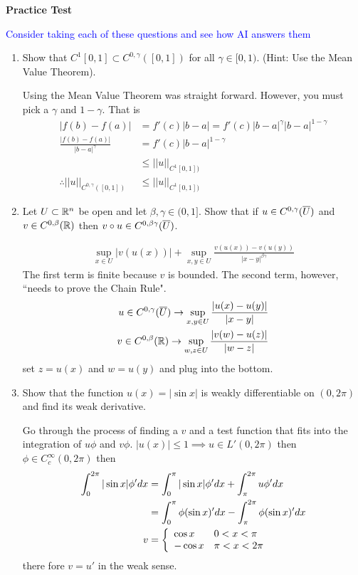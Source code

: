 \documentclass[12pt,a4paper]{report}
\newcommand{\BLUE}[1]{\textcolor{blue}{#1}}
\newcommand{\HSPACE}[3]{C^{#1,#2}(#3)}
\newcommand{\HOLDERNORM}[4]{|| #4 ||_{\HSPACE{#1}{#2}{#3}}}
\begin{document}
\newpage
\textbf{Practice Test}

\BLUE{Consider taking each of these questions and see how AI answers them}

\begin{enumerate}
	\item Show that $C^1[0,1]\subset \HSPACE{0}{\gamma}{[0,1]}$ for all $\gamma \in [0,1)$.  (Hint: Use the Mean Value Theorem).

	Using the Mean Value Theorem was straight forward.  However, you must pick a $\gamma$ and $1-\gamma$.  That is
	\begin{align*}
		|f(b) - f(a)| &= f'(c)|b-a| = f'(c)|b-a|^\gamma|b-a|^{1-\gamma}\\
		\frac{|f(b) - f(a)|}{|b-a|^\gamma} &= f'(c)|b-a|^{1-\gamma}\\
		&\le ||u||_{C^1{[0,1])}} \\
		\therefore \HOLDERNORM{0}{\gamma}{[0,1]}{u} &\le ||u||_{C^1{[0,1])}} 
\end{align*}		
	\newpage
	\item Let $U \subset \mathbb{R}^n$ be open and let $\beta, \gamma \in (0,1]$.  Show that if $u \in \HSPACE{0}{\gamma}{\CONJ{U}}$ and $v \in \HSPACE{0}{\beta}{\R}$ then $v\circ u \in \HSPACE{0}{\beta\gamma}{\CONJ{U}}$.
	
	\begin{align*}
		\sup_{x\in U} |v(u(x))| + \sup_{x,y \in U} \frac{v(u(x))-v(u(y))}{|x-y|^{\beta\gamma}}
	\end{align*}The first term is finite because $v$ is bounded.  The second term, however, ``needs to prove the Chain Rule".
	\begin{align*}
		u \in \HSPACE{0}{\gamma}{\CONJ{U}} \to \sup_{x,y\in U} \frac{|u(x)-u(y)|}{|x-y|} \\
		v \in \HSPACE{0}{\beta}{\R} \to \sup_{w,z\in U} \frac{|v(w)-u(z)|}{|w-z|}
	\end{align*}set $z=u(x)$ and $w=u(y)$ and plug into the bottom.
	
	\newpage
	\item Show that the function $u(x) = |\sin x|$ is weakly differentiable on $(0,2\pi)$ and find its weak derivative.
	
	Go through the process of finding a $v$ and a test function that fits into the integration of $u\phi$ and $v\phi$.  $|u(x)|\le 1 \implies u\in L'(0,2\pi)$ then $\phi \in C_c^\infty(0,2\pi)$ then
	\begin{align*}
		\int_0^{2\pi} |\sin x|\phi' dx &= \int_0^{\pi} |\sin x|\phi' dx + \int_\pi^{2\pi} u\phi' dx \\
		&= \int_0^{\pi} \phi(\sin x)' dx - \int_\pi^{2\pi} \phi(\sin x)' dx \\  
		v &= \left \{ \begin{array}{ll} \cos x & 0< x< \pi\\ -\cos x & \pi < x < 2\pi \end{array} \right .
	\end{align*}there fore $v=u'$ in the weak sense.
	

\end{enumerate}
\end{document}
